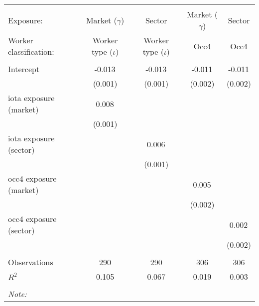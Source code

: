 \begin{tabular}{@{\extracolsep{5pt}}lcccc}
\\[-1.8ex]\hline
\hline \\[-1.8ex]
\hline \\[-1.8ex]
 Exposure: & Market ($\gamma$) & Sector & Market ($\gamma$) & Sector \\
 Worker classification: & Worker type ($\iota$) & Worker type ($\iota$) & Occ4 & Occ4 \\
 \hline &  &  &  &  \\
 Intercept & -0.013$^{}$ & -0.013$^{}$ & -0.011$^{}$ & -0.011$^{}$ \\
  & (0.001) & (0.001) & (0.002) & (0.002) \\
 iota exposure (market) & 0.008$^{}$ & & & \\
  & (0.001) & & & \\
 iota exposure (sector) & & 0.006$^{}$ & & \\
  & & (0.001) & & \\
 occ4 exposure (market) & & & 0.005$^{}$ & \\
  & & & (0.002) & \\
 occ4 exposure (sector) & & & & 0.002$^{}$ \\
  & & & & (0.002) \\
\hline \\[-1.8ex]
 Observations & 290 & 290 & 306 & 306 \\
 $R^2$ & 0.105 & 0.067 & 0.019 & 0.003 \\
\hline
\hline \\[-1.8ex]
\textit{Note:}\end{tabular}